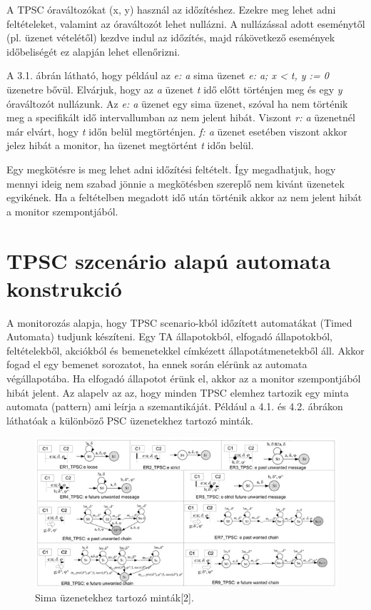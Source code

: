 A TPSC óraváltozókat (x, y) használ az időzítéshez.
Ezekre meg lehet adni feltételeket, valamint az óraváltozót lehet nullázni.
A nullázással adott eseménytől (pl. üzenet vételétől) kezdve indul az időzítés, majd rákövetkező események időbeliségét ez alapján lehet ellenőrizni.

A 3.1. ábrán látható, hogy például az \textit{e: a} sima üzenet \textit{e: a; x < t, y := 0} üzenetre bővül.
Elvárjuk, hogy az \textit{a} üzenet \textit{t} idő előtt történjen meg és egy \textit{y} óraváltozót nullázunk.
Az \textit{e: a} üzenet egy sima üzenet, szóval ha nem történik meg a specifikált idő intervallumban az nem jelent hibát.
Viszont \textit{r: a} üzenetnél már elvárt, hogy \textit{t} időn belül megtörténjen. \textit{f: a} üzenet esetében viszont akkor jelez hibát a monitor, ha üzenet megtörtént \textit{t} időn belül.

Egy megkötésre is meg lehet adni időzítési feltételt.
Így megadhatjuk, hogy mennyi ideig nem szabad jönnie a megkötésben szereplő nem kivánt üzenetek egyikének.
Ha a feltételben megadott idő után történik akkor az nem jelent hibát a monitor szempontjából.

\clearpage\section{TPSC szcenário alapú automata konstrukció}

A monitorozás alapja, hogy TPSC scenario-kból időzített automatákat (Timed Automata) tudjunk készíteni.
Egy TA állapotokból, elfogadó állapotokból, feltételekből, akciókból és bemenetekkel címkézett állapotátmenetekből áll.
Akkor fogad el egy bemenet sorozatot, ha ennek során elérünk az automata végállapotába.
Ha elfogadó állapotot érünk el, akkor az a monitor szempontjából hibát jelent.
Az alapelv az az, hogy minden TPSC elemhez tartozik egy minta automata (pattern) ami leírja a szemantikáját.
Például a 4.1. és 4.2. ábrákon láthatóak a különböző PSC üzenetekhez tartozó minták.

\begin{figure}[!ht]
    \centering
    \includegraphics[width=150mm, keepaspectratio]{figures/5abra.png}
    \caption{Sima üzenetekhez tartozó minták[2].}
\end{figure}

